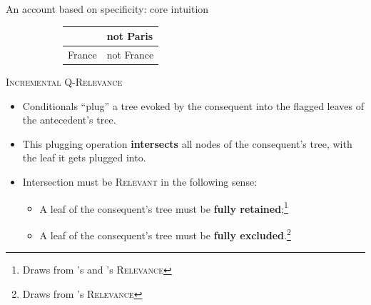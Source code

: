 \documentclass[10pt]{beamer}
\newcommand{\weaker}[1]{\textbf{\textcolor{blue}{#1}}}
\newcommand{\France}{\textbf{\textcolor{blue}{France}}}
\begin{document}
\begin{frame}{An account based on specificity: core intuition}
\begin{figure}[H]
\begin{subfigure}[t]{.47\linewidth}
			\end{subfigure}
			\hfill
			\begin{subfigure}[t]{.47\linewidth}
				\centering
				\begin{tabular}{llll|}
					\cline{2-4} 
					\multicolumn{1}{l|}{}   & \multicolumn{3}{l|}{\cellcolor{orange!20!white}not Paris}      \\ 
					\hline
					\multicolumn{2}{|l|}{France} & \multicolumn{2}{l|}{not France} \\ \hline
				\end{tabular}
				\label{tab:italy-not-noto-polar-rel}
			\end{subfigure}
		\end{figure}
\end{frame}

\begin{frame}{\textsc{Incremental Q-Relevance}}
	\begin{minipage}{.55\linewidth}
		\vspace{5mm}
		\begin{itemize}
			\item Conditionals ``plug'' a tree evoked by the consequent into the flagged leaves of the antecedent's tree.\pause
			\item This plugging operation \textbf{intersects} all nodes of the consequent's tree, with the leaf it gets plugged into.\pause
			\item Intersection must be \textsc{Relevant} in the following sense:\pause
			\begin{itemize}
				\item A leaf of the consequent's tree must be \textbf{fully retained};\footnote{Draws from \citet{Lewis1988}'s and \citet{Kriz2020}'s \textsc{Relevance}}\pause
				\item A leaf of the consequent's tree must be \textbf{fully excluded}.\footnote{Draws from \citet{Roberts2012}'s \textsc{Relevance}}
			\end{itemize}
		\end{itemize}
	\end{minipage}
	\hfill
	\begin{minipage}{.4\linewidth}
		\centering{}
		\begin{figure}[H]
			\centering
			\begin{minipage}{\linewidth}
				\centering
				\scalebox{.8}{
					\begin{forest}
						[CS[\xcancel{\faFlagCheckered}\\\France][\weaker{Italy}][\weaker{...}]]

\end{forest}}
\end{minipage}
\end{figure}
\end{minipage}
\end{frame}
\end{document}
